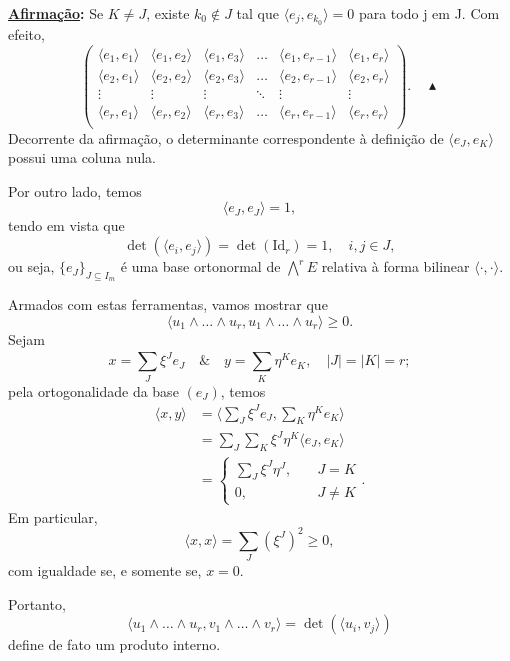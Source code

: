 \documentclass[../differential_forms.tex]{subfiles}
\begin{document}
\begin{proof*}
	\textbf{\underline{Afirmação}:} Se \(K\neq J\), existe \(k_{0}\not\in J\) tal que \(\langle e_{j}, e_{k_{0}} \rangle = 0\) para todo j em J. Com efeito,
	\[
		\begin{pmatrix}
			\langle e_1, e_1 \rangle & \langle e_1, e_2 \rangle & \langle e_1, e_3 \rangle & \dotsc & \langle e_1, e_{r-1} \rangle & \langle e_1, e_r \rangle \\
			\langle e_2, e_1 \rangle & \langle e_2, e_2 \rangle & \langle e_2, e_3 \rangle & \dotsc & \langle e_2, e_{r-1} \rangle & \langle e_2, e_r \rangle \\
			\vdots                   & \vdots                   & \vdots                   & \ddots & \vdots                       & \vdots                   \\
			\langle e_r, e_1 \rangle & \langle e_r, e_2 \rangle & \langle e_r, e_3 \rangle & \dotsc & \langle e_r, e_{r-1} \rangle & \langle e_r, e_r \rangle \\
		\end{pmatrix}.\quad  \blacktriangle
	\]
	Decorrente da afirmação, o determinante correspondente à definição de \(\langle e_{J}, e_{K} \rangle\) possui uma coluna nula.

	Por outro lado, temos
	\[
		\langle e_{J}, e_{J} \rangle = 1,
	\]
	tendo em vista que
	\[
		\det{(\langle e_{i}, e_{j} \rangle)} = \det{(\mathrm{Id}_{r})} = 1,\quad i, j\in J,
	\]
	ou seja, \(\{e_{J}\}_{J\subseteq I_{m}}\) é uma base ortonormal de \(\bigwedge^{r}E\) relativa à forma bilinear \(\langle \cdot , \cdot  \rangle\).

	Armados com estas ferramentas, vamos mostrar que
	\[
		\langle u_1\wedge \dotsc \wedge u_r, u_1\wedge \dotsc \wedge u_r \rangle \geq 0.
	\]
	Sejam
	\[
		x = \sum\limits_{J}^{}\xi^{J}e_{J} \quad\&\quad y = \sum\limits_{K}^{}\eta^{K}e_{K},\quad | J | = | K | = r;
	\]
	pela ortogonalidade da base \((e_{J})\), temos
	\begin{align*}
		\langle x, y \rangle & = \biggl\langle \sum\limits_{J}^{}\xi^{J}e_{J}, \sum\limits_{K}^{}\eta^{K}e_{K} \biggr\rangle \\
		                     & = \sum\limits_{J}^{}\sum\limits_{K}^{}\xi^{J}\eta^{K}\langle e_{J}, e_{K} \rangle             \\
		                     & = \left\{\begin{array}{ll}
			                                \sum\limits_{J}^{}\xi^{J}\eta^{J}, & \quad J = K   \\
			                                0,                                 & \quad J\neq K
		                                \end{array}\right..
	\end{align*}
	Em particular,
	\[
		\langle x, x \rangle = \sum\limits_{J}^{}(\xi^{J})^{2} \geq 0,
	\]
	com igualdade se, e somente se, \(x=0\).

	Portanto,
	\[
		\langle u_1\wedge \dotsc \wedge u_r, v_1\wedge \dotsc \wedge v_r \rangle = \det{(\langle u_{i}, v_{j} \rangle)}
	\]
	define de fato um produto interno. \qedsymbol

\end{proof*}
\end{document}
